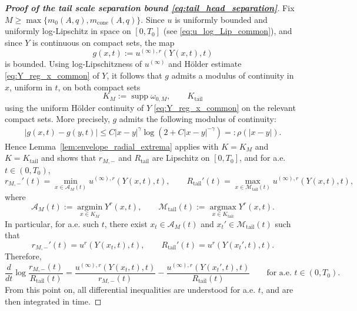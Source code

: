 \documentclass[reqno,11pt]{amsart}
\begin{document}
\begin{proof}[\textbf{Proof of the tail scale separation bound \eqref{eq:tail_head_separation}}]
Fix  $M\geq \max\{m_0(A,q),m_{\mathrm{cone}}(A,q)\}$. 
Since $u$ is uniformly bounded and uniformly log-Lipschitz in space on $[0,T_0]$ (see \eqref{eq:u_log_Lip_common}), and
since $Y$ is continuous on compact sets, the map
\[
g(x,t):=u^{(\infty),r}(Y(x,t),t)
\]
is bounded. Using log-Lipschitzness of $u^{(\infty)}$ and H\"older estimate \eqref{eq:Y_reg_x_common} of $Y$, it follows that $g$ admits a modulus of continuity in $x$, uniform in $t$, on both compact
sets
\[
K_M:=\operatorname{supp}\omega_{0,M},
\qquad
K_{\mathrm{tail}}
\]
using the uniform H\"older continuity of $Y$ \eqref{eq:Y_reg_x_common} on the relevant compact sets.
More precisely, $g$ admits the following modulus of continuity:
    \begin{align*}
        |g(x,t)- g(y,t)|
    \leq
        C |x-y|^\gamma \log (2+C|x-y|^{-\gamma})=: \rho (|x-y|).
    \end{align*}
Hence Lemma~\ref{lem:envelope_radial_extrema} applies with $K=K_M$ and $K=K_{\mathrm{tail}}$ and shows that $r_{M,-}$ and
$R_{\mathrm{tail}}$ are Lipschitz on $[0,T_0]$, and for a.e. $t\in (0,T_0)$,
\[
r_{M,-}'(t)
=
\min_{x\in \mathcal A_M(t)} u^{(\infty),r}(Y(x,t),t),
\qquad
R_{\mathrm{tail}}'(t)
=
\max_{x\in \mathcal M_{\mathrm{tail}}(t)} u^{(\infty),r}(Y(x,t),t),
\]
where
\[
\mathcal A_M(t)
:=
\operatorname*{argmin}_{x\in K_M} Y^r(x,t),
\qquad
\mathcal M_{\mathrm{tail}}(t)
:=
\operatorname*{argmax}_{x\in K_{\mathrm{tail}}} Y^r(x,t).
\]
In particular, for a.e. such $t$, there exist
$x_t\in \mathcal A_M(t)$ and $x_t'\in \mathcal M_{\mathrm{tail}}(t)$ such that
\[
r_{M,-}'(t)=u^r(Y(x_t,t),t),
\qquad
R_{\mathrm{tail}}'(t)=u^r(Y(x_t',t),t).
\]
Therefore,
\[
\frac{d}{dt}\log\frac{r_{M,-}(t)}{R_{\mathrm{tail}}(t)}
=
\frac{u^{(\infty),r}(Y(x_t,t),t)}{r_{M,-}(t)}
-
\frac{u^{(\infty),r}(Y(x_t',t),t)}{R_{\mathrm{tail}}(t)}
\qquad
\text{for a.e. }t\in (0,T_0).
\]
From this point on, all differential inequalities are understood for a.e. $t$, and are
then integrated in time.




\end{proof}
\end{document}
